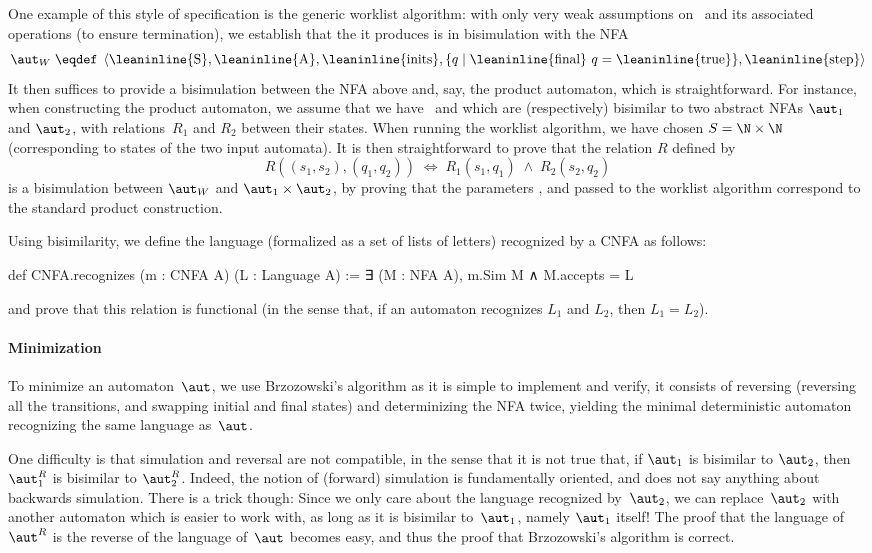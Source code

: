 One example of this style of specification is the generic worklist algorithm:
with only very weak assumptions on~ and its associated
operations (to ensure termination), we establish that the
 it produces is in bisimulation with the NFA
%
\[
  \aut_W \;\eqdef\;
  \left<\text{\leaninline{S}}, \text{\leaninline{A}},
  \text{\leaninline{inits}}, \{q \mid  \text{\leaninline{final}}~q =
  \text{\leaninline{true}}
  \} , \text{\leaninline{step}} \right>
\]
%
It then suffices to provide a bisimulation between the NFA above and, say, the
product automaton, which is straightforward.
%
For instance, when constructing the product automaton, we assume that we
have~ and  which are (respectively) bisimilar to
two abstract NFAs $\aut_1$ and $\aut_2$, with relations~$R_1$ and $R_2$ between
their states.
%
When running the worklist algorithm, we have chosen $S = \N \times \N$
(corresponding to states of the two input automata). It is then straightforward to
prove that the relation $R$ defined by
\[
  R((s_1, s_2), (q_1, q_2)) \;\iff\; R_1(s_1, q_1) \;\land\; R_2(s_2, q_2)
\]
is a bisimulation between $\aut_W$ and $\aut_1 \times \aut_2$, by proving that
the parameters ,  and 
passed to the worklist algorithm correspond to the standard product construction.

Using bisimilarity, we define the language (formalized as a set of lists of
letters) recognized by a CNFA as follows:
\begin{lean}
  def CNFA.recognizes (m : CNFA A) (L : Language A) :=
    ∃ (M : NFA A), m.Sim M ∧ M.accepts = L
\end{lean}
and prove that this relation is functional (in the sense that, if an automaton
recognizes $L_1$ and $L_2$, then $L_1 = L_2$).

\paragraph{Minimization} To minimize an automaton~$\aut$, we use Brzozowski's algorithm
as it is simple to implement and verify, it consists of reversing (reversing all
the transitions, and swapping initial and final states) and
determinizing the NFA twice, yielding the minimal deterministic automaton
recognizing the same language as~$\aut$.

One difficulty is that simulation and reversal are not compatible, in the sense
that it is not true that, if $\aut_1$ is bisimilar to $\aut_2$, then $\aut_1^R$
is bisimilar to $\aut_2^R$. Indeed, the notion of (forward) simulation is
fundamentally oriented, and does not say anything about backwards simulation.
%
There is a trick though: Since we only care about the language recognized
by~$\aut_2$, we can replace~$\aut_2$ with another automaton which is easier to
work with, as long as it is bisimilar to~$\aut_1$, namely $\aut_1$ itself! The
proof that the language of~$\aut^R$ is the reverse of the language of~$\aut$
becomes easy, and thus the proof that Brzozowski's algorithm is correct.


